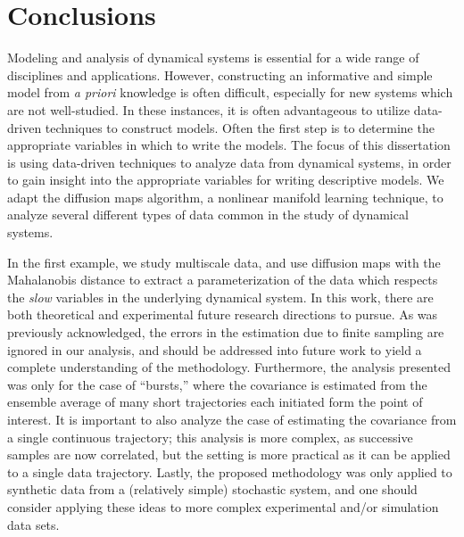
\chapter{Conclusions \label{ch:conclusion}}

Modeling and analysis of dynamical systems is essential for a wide range of disciplines and applications. 
%
However, constructing an informative and simple model from {\em a priori} knowledge is often difficult, especially for new systems which are not well-studied. 
%
In these instances, it is often advantageous to utilize data-driven techniques to construct models.
%
Often the first step is to determine the appropriate variables in which to write the models. 
%
The focus of this dissertation is using data-driven techniques to analyze data from dynamical systems, in order to gain insight into the appropriate variables for writing descriptive models. 
%
We adapt the diffusion maps algorithm, a nonlinear manifold learning technique,  to analyze several different types of data common in the study of dynamical systems. 

In the first example, we study multiscale data, and use diffusion maps with the Mahalanobis distance to extract a parameterization of the data which respects the {\em slow} variables in the underlying dynamical system. 
%
In this work, there are both theoretical and experimental future research directions to pursue. 
%
As was previously acknowledged, the errors in the estimation due to finite sampling are ignored in our analysis, and should be addressed into future work to yield a complete understanding of the methodology. 
%
Furthermore, the analysis presented was only for the case of ``bursts,'' where the covariance is estimated from the ensemble average of many short trajectories each initiated form the point of interest. 
%
It is important to also analyze the case of estimating the covariance from a single continuous trajectory; this analysis is more complex, as successive samples are now correlated, but the setting is more practical as it can be applied to a single data trajectory.
%
Lastly, the proposed methodology was only applied to synthetic data from a (relatively simple) stochastic system, and one should consider applying these ideas to more complex experimental and/or simulation data sets. 

